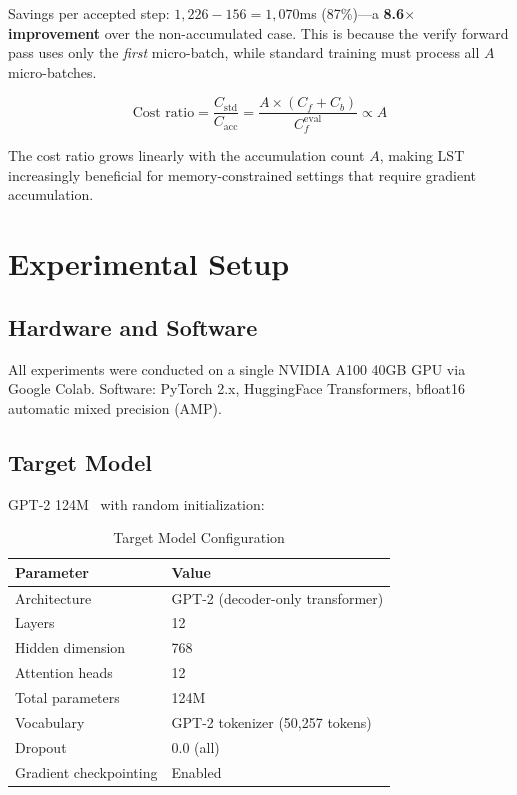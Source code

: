 \documentclass[conference]{IEEEtran}
\begin{document}
Savings per accepted step: $1{,}226 - 156 = 1{,}070$ms (87\%)---a \textbf{8.6$\times$ improvement} over the non-accumulated case. This is because the verify forward pass uses only the \emph{first} micro-batch, while standard training must process all $A$ micro-batches.

\begin{equation}
\text{Cost ratio} = \frac{C_{\mathrm{std}}}{C_{\mathrm{acc}}} = \frac{A \times (C_f + C_b)}{C_f^{\mathrm{eval}}} \propto A
\label{eq:cost_ratio}
\end{equation}

The cost ratio grows linearly with the accumulation count $A$, making LST increasingly beneficial for memory-constrained settings that require gradient accumulation.

\section{Experimental Setup}
\label{sec:setup}

\subsection{Hardware and Software}

All experiments were conducted on a single NVIDIA A100 40GB GPU via Google Colab. Software: PyTorch 2.x, HuggingFace Transformers, bfloat16 automatic mixed precision (AMP).

\subsection{Target Model}

GPT-2 124M~\cite{radford2019language} with random initialization:

\begin{table}[h]
\centering
\caption{Target Model Configuration}
\label{tab:target_model}
\begin{tabular}{@{}ll@{}}
\toprule
\textbf{Parameter} & \textbf{Value} \\
\midrule
Architecture & GPT-2 (decoder-only transformer) \\
Layers & 12 \\
Hidden dimension & 768 \\
Attention heads & 12 \\
Total parameters & 124M \\
Vocabulary & GPT-2 tokenizer (50,257 tokens) \\
Dropout & 0.0 (all) \\
Gradient checkpointing & Enabled \\
\bottomrule
\end{tabular}
\end{table}
\end{document}
